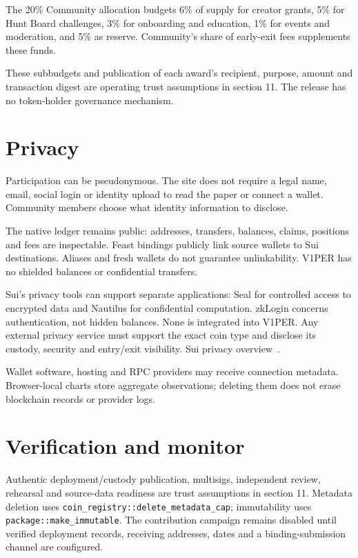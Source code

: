 \documentclass[11pt]{article}
\newcommand{\VOnePER}{\texorpdfstring{V\textcolor{brandone}{1}PER}{V1PER}}
\begin{document}
The 20\% Community allocation budgets 6\% of supply for creator grants, 5\% for Hunt Board challenges, 3\% for onboarding and education, 1\% for events and moderation, and 5\% as reserve. Community's share of early-exit fees supplements these funds.

These subbudgets and publication of each award's recipient, purpose, amount and transaction digest are operating trust assumptions in section 11. The release has no token-holder governance mechanism.

\section{Privacy}

Participation can be pseudonymous. The site does not require a legal name, email, social login or identity upload to read the paper or connect a wallet. Community members choose what identity information to disclose.

The native ledger remains public: addresses, transfers, balances, claims, positions and fees are inspectable. Feast bindings publicly link source wallets to Sui destinations. Aliases and fresh wallets do not guarantee unlinkability. \VOnePER{} has no shielded balances or confidential transfers.

Sui's privacy tools can support separate applications: Seal for controlled access to encrypted data and Nautilus for confidential computation. zkLogin concerns authentication, not hidden balances. None is integrated into \VOnePER{}. Any external privacy service must support the exact coin type and disclose its custody, security and entry/exit visibility. Sui privacy overview~\cite{ref7}.

Wallet software, hosting and RPC providers may receive connection metadata. Browser-local charts store aggregate observations; deleting them does not erase blockchain records or provider logs.

\section{Verification and monitor}

Authentic deployment/custody publication, multisigs, independent review, rehearsal and source-data readiness are trust assumptions in section 11. Metadata deletion uses \texttt{coin\_registry::delete\_metadata\_cap}; immutability uses \texttt{package::make\_immutable}. The contribution campaign remains disabled until verified deployment records, receiving addresses, dates and a binding-submission channel are configured.
\end{document}

